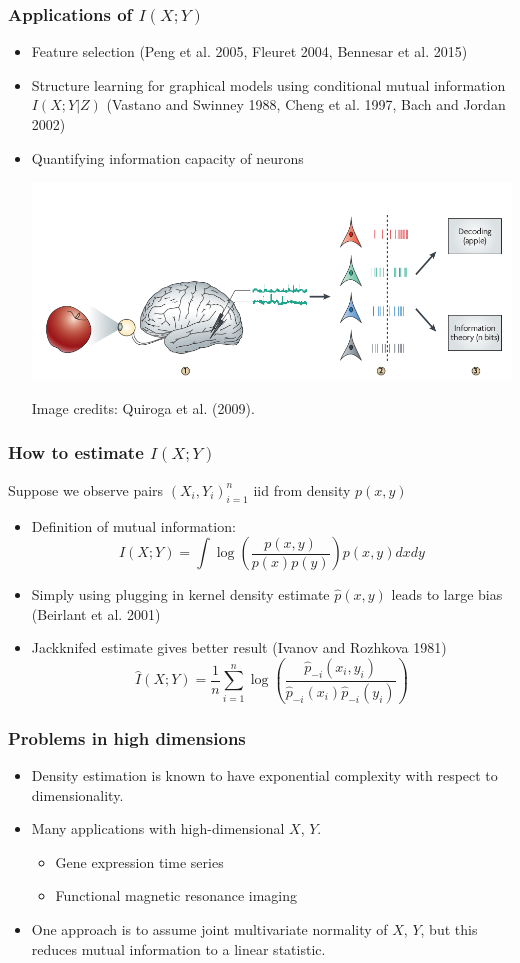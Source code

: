 \documentclass{beamer}
\begin{document}
\begin{frame}
\frametitle{Applications of $I(X; Y)$} 
\begin{itemize}
\item Feature selection (Peng et al. 2005, Fleuret 2004, Bennesar et al. 2015)
\item Structure learning for graphical models using conditional mutual information $I(X; Y|Z)$
(Vastano and Swinney 1988, Cheng et al. 1997, Bach and Jordan 2002)
\item Quantifying information capacity of neurons
\begin{center}
\includegraphics[scale = 0.2]{quiroga.png}
\end{center}
\tiny{Image credits: Quiroga et al. (2009).}
\end{itemize}
\end{frame}

\begin{frame}
\frametitle{How to estimate $I(X; Y)$}
Suppose we observe pairs $(X_i,Y_i)_{i=1}^n$ iid from density $p(x, y)$
\begin{itemize}
\item Definition of mutual information:
\[
I(X; Y) = \int \log \left(\frac{p(x, y)}{p(x)p(y)}\right) p(x, y) dx dy
\]
\item Simply using plugging in kernel density estimate $\hat{p}(x, y)$ leads to large bias (Beirlant et al. 2001)
\item Jackknifed estimate gives better result (Ivanov and Rozhkova 1981)
\[
\hat{I}(X; Y) = \frac{1}{n} \sum_{i=1}^n \log \left(\frac{\hat{p}_{-i}(x_i, y_i)}{\hat{p}_{-i}(x_i)\hat{p}_{-i}(y_i)}\right)
\]
\end{itemize}
\end{frame}

\begin{frame}
\frametitle{Problems in high dimensions}
\begin{itemize}
\item Density estimation is known to have exponential complexity with respect to dimensionality.
\item Many applications with high-dimensional $X$, $Y$.
\begin{itemize}
\item Gene expression time series
\item Functional magnetic resonance imaging
\end{itemize}
\item One approach is to assume joint multivariate normality of $X$, $Y$, but this reduces mutual information to a linear statistic.
\end{itemize}
\end{frame}
\end{document}
